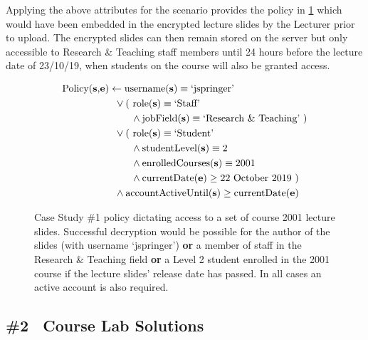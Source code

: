 Applying the above attributes for the scenario provides the policy in \cref{fig:case_study_policy_1} which would have been embedded in the encrypted lecture slides by the Lecturer prior to upload. The encrypted slides can then remain stored on the server but only accessible to Research \& Teaching staff members until 24 hours before the lecture date of 23/10/19, when students on the course will also be granted access.

\begin{figure}[ht]
  \centering
\begin{align*}
  \text{Policy(\textbf{s},\textbf{e})}
  &
    \leftarrow
    \text{username(\textbf{s})} \equiv \text{`jspringer'}
  \\
  &
    \phantom{::}\vee
    \text{( role(\textbf{s})} \equiv \text{`Staff'}
  \\
  &
    \phantom{::::::::}\wedge
    \text{jobField(\textbf{s})} \equiv \text{`Research \& Teaching' )}
  \\
  &
    \phantom{::}\vee
    \text{( role(\textbf{s})} \equiv \text{`Student'}
  \\
  &
    \phantom{::::::::}\wedge
    \text{studentLevel(\textbf{s})} \equiv \text{2}
  \\
  &
    \phantom{::::::::}\wedge
    \text{enrolledCourses(\textbf{s})} \equiv \text{2001}
  \\
  &
    \phantom{::::::::}\wedge
    \text{currentDate(\textbf{e})} \geq \text{22 October 2019 )}
  \\
  &
    \phantom{::}\wedge
    \text{accountActiveUntil(\textbf{s})} \geq \text{currentDate(\textbf{e})}
\end{align*}
  \caption{
    \label{fig:case_study_policy_1}
    Case Study \#1 policy dictating access to a set of course 2001 lecture slides.
    Successful decryption would be possible for the author of the slides (with username `jspringer') \textbf{or} a member of staff in the Research \& Teaching field \textbf{or} a Level 2 student enrolled in the 2001 course if the lecture slides' release date has passed. In all cases an active account is also required.
  }
\end{figure}

\subsection{\#2 \textemdash\ Course Lab Solutions}
\label{subsec:analysis_case_studies_2}

